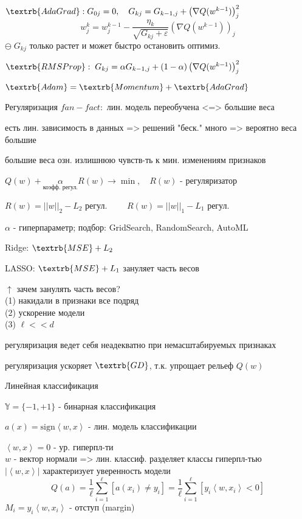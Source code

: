 \documentclass[final]{beamer}
\newlength{\colwidth}
\begin{document}
\begin{frame}[t]
\begin{columns}[t]
\begin{column}{\colwidth}
$\textrb{AdaGrad}: G_{0j} = 0, \quad G_{kj} = G_{k-1,j} + \left(\nabla Q(w^{k-1}) \right)_j^2$
\[w_j^k = w_j^{k-1} - \frac{\eta_k}{\sqrt{G_{kj} +\varepsilon}} \left(\nabla Q(w^{k-1})\right)_j\]
$\ominus \; G_{kj}$ {\small только растет и может быстро остановить оптимиз.}

$\textrb{RMSProp}: \; G_{kj} = \alpha G_{k-1,j} + (1 - \alpha) \left(\nabla Q(w^{k-1}) \right)_j^2$\\
\hrulefill

$\textrb{Adam} = \textrb{Momentum} + \textrb{AdaGrad} $

\begin{block}{Регуляризация}
$fan-fact:$ {\small лин. модель переобучена <=> большие веса}

{\small есть лин. зависимость в данных => решений "беск." много => вероятно веса большие}

{\small большие веса озн. излишнюю чувств-ть к мин. изменениям признаков}

$Q(w) + \alpha\limits_{\text{коэфф. регул.}} R(w) \to \min, \quad R(w)$ - {\small регуляризатор}

$R(w) = ||w||_2 - L_2$ {\small регул.} $ \quad \quad R(w) = ||w||_1 - L_1$ {\small регул.}

$\alpha$ - {\small гиперпараметр; подбор: GridSearch, RandomSearch, AutoML}

{\small Ridge:} $\textrb{MSE} + L_2$

{\small LASSO:} $\textrb{MSE} + L_1$ {\small зануляет часть весов}

$\uparrow$ {\small зачем занулять часть весов?\\
(1) накидали в признаки все подряд\\
(2) ускорение модели\\
(3)} $\ell << d$

{\small регуляризация ведет себя неадекватно при немасштабируемых признаках}

{\small регуляризация ускоряет } $\textrb{GD}$, {\small т.к. упрощает рельеф } $Q(w)$
\end{block} 

\begin{block}{Линейная классификация}

$\mathbb{Y} = \{-1, +1\}$ - {\small бинарная классификация}

$a(x) = \text{sign} \left<w, x\right>$ - {\small лин. модель классификации}

$\left<w, x\right> = 0$ - {\small ур. гиперпл-ти}\\
$w$ - {\small вектор нормали => лин. классиф. разделяет классы гиперпл-тью}\\
$\left|\left<w, x\right>\right|$ {\small характеризует уверенность модели}
\[Q(a) = \frac{1}{\ell} \sum\limits_{i = 1}^{\ell} [a(x_i) \ne y_i] = \frac{1}{\ell} \sum\limits_{i = 1}^{\ell} [y_i\left<w, x_i\right> < 0]\]
$M_i = y_i\left<w, x_i\right>$ - {\small отступ (margin)}


\end{block}
\end{column}
\end{columns}
\end{frame}
\end{document}
